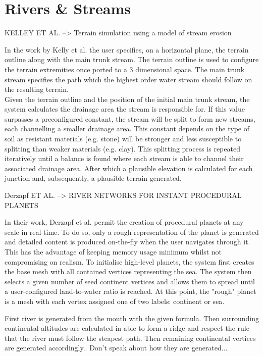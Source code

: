 \section{Rivers \& Streams}

KELLEY ET AL. --> Terrain simulation using a model of stream erosion

In the work by Kelly et al. the user specifies, on a horizontal plane, the terrain outline along with the main trunk stream. The terrain outline is used to configure the terrain extremities once ported to a 3 dimensional space. The main trunk stream specifies the path which the highest order water stream should follow on the resulting terrain.\\
Given the terrain outline and the position of the initial main trunk stream, the system calculates the drainage area the stream is responsible for. If this value surpasses a preconfigured constant, the stream will be split to form new streams, each channelling a smaller drainage area. This constant depends on the type of soil as resistant materials (e.g. stone) will be stronger and less susceptible to splitting than weaker materials (e.g. clay). This splitting process is repeated iteratively until a balance is found where each stream is able to channel their associated drainage area. After which a plausible elevation is calculated for each junction and, subsequently, a plausible terrain generated.


Derzapf ET AL. --> RIVER NETWORKS FOR INSTANT PROCEDURAL PLANETS

In their work, Derzapf et al. permit the creation of procedural planets at any scale in real-time. To do so, only a rough representation of the planet is generated and detailed content is produced on-the-fly when the user navigates through it. This has the advantage of keeping memory usage minimum whilst not compromising on realism. 
To initialise high-level planets, the system first creates the base mesh with all contained vertices representing the sea. The system then selects a given number of seed continent vertices and allows them to spread until a user-configured land-to-water ratio is reached. At this point, the "rough" planet is a mesh with each vertex assigned one of two labels: continent or sea. 

First river is generated from the mouth with the given formula. Then surrounding continental altitudes are calculated in able to form a ridge and respect the rule that the river must follow the steapest path. Then remaining continental vertices are generated accordingly.. Don't speak about how they are generated... 

